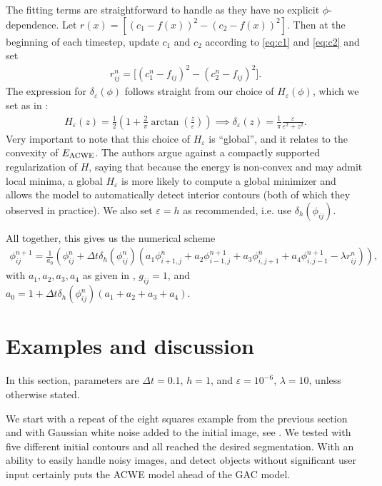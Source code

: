 The fitting terms are straightforward to handle as they have no explicit $\phi$-dependence. Let $r(x) = [(c_1 - f(x))^2 - (c_2 - f(x))^2 ]$. Then at the beginning of each timestep, update $c_1$ and $c_2$ according to \eqref{eq:c1} and \eqref{eq:c2} and set
\begin{align*}
r_{ij}^n = \big[ (c_1^n - f_{ij})^2 - (c_2^n - f_{ij})^2 \big].
\end{align*}
The expression for $\delta_\varepsilon(\phi)$ follows straight from our choice of $H_\varepsilon(\phi)$, which we set as in \cite{chan2001active}:
\begin{align*}
H_\varepsilon(z)
 = \frac{1}{2} 
\left(1 + \frac{2}{\pi}\arctan
\left(\frac{z}{\varepsilon} 
\right) \right)
\implies 
\delta_\varepsilon(z)  
=  \frac{1}{\pi}\frac{\varepsilon}{\varepsilon^2  + z^2}.
\end{align*}
Very important to note that this choice of $H_\varepsilon$ is ``global'', and it relates to the convexity of $E_\textrm{ACWE}$. The authors argue against a compactly supported regularization of $H$, saying that because the energy is non-convex and may admit local minima, a global $H_\varepsilon$ is more likely to compute a global minimizer and allows the model to automatically detect interior contours (both of which they observed in practice). We also set $\varepsilon = h$ as recommended, i.e. use $\delta_h(\phi_{ij})$.

All together, this gives us the numerical scheme
\begin{align*}
\phi^{n+1}_{ij} 
= \frac{1}{a_0} 
\left( \phi^n_{ij} + \Delta t \delta_h(\phi_{ij}^n)
\left( a_1 \phi^n_{i+1,j} + a_2 \phi^{n+1}_{i-1,j} + a_3 \phi^{n}_{i,j+1} + a_4 \phi^{n+1}_{i,j-1} 
- \lambda r_{ij}^n
\right)
\right),
\end{align*}
with $a_1, a_2, a_3, a_4$  as given in , $g_{ij} = 1$, and $a_0 = 1 + \Delta t \delta_h(\phi_{ij}^n)(a_1 + a_2 + a_3 + a_4)$.

\section{Examples and discussion}
In this section, parameters are $\Delta t = 0.1$, $h = 1$, and $\varepsilon = 10^{-6}$, $\lambda = 10$, unless otherwise stated.

We start with a repeat of the eight squares example from the previous section and with Gaussian white noise added to the initial image, see . We tested with five different initial contours and all reached the desired segmentation. With an ability to easily handle noisy images, and detect objects without significant user input certainly puts the ACWE model ahead of the GAC model.

